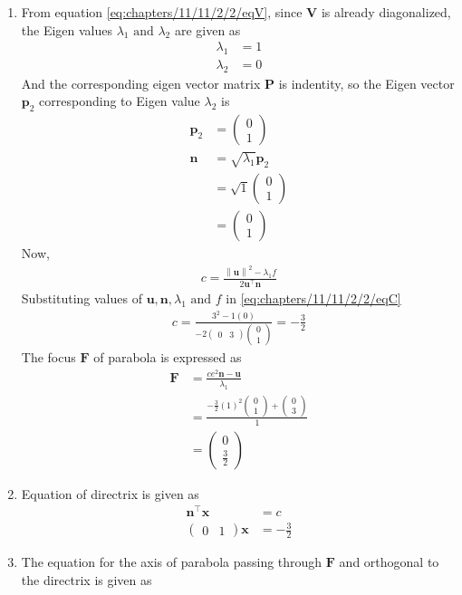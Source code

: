 \documentclass[12pt]{article}
\providecommand{\brak}[1]{\ensuremath{\left(#1\right)}}
\providecommand{\norm}[1]{\left\lVert#1\right\rVert}
\newcommand{\myvec}[1]{\ensuremath{\begin{pmatrix}#1\end{pmatrix}}}
\let\vec\mathbf
\begin{document}
\begin{enumerate}
\item From equation \eqref{eq:chapters/11/11/2/2/eqV}, since $\vec{V}$ is already diagonalized, the Eigen values $\lambda_1 \text{ and } \lambda_2$ are given as
\begin{align}
	\label{eq:chapters/11/11/2/2/eqEigen1}
	\lambda_1 &= 1\\
	\label{eq:chapters/11/11/2/2/eqEigen2}
	\lambda_2 &= 0
\end{align}
And the corresponding eigen vector matrix $\vec{P}$ is indentity, so the Eigen vector $\vec{p}_2$ corresponding to Eigen value $\lambda_2$ is
\begin{align}
	\vec{p}_2 &= \myvec{0\\1}\\
	\vec{n} &= \sqrt{\lambda_1}\vec{p}_2\\
		&= \sqrt{1}\myvec{0\\1}\\
		&= \myvec{0\\1}
\end{align}
Now,
\begin{align}
	\label{eq:chapters/11/11/2/2/eqC}
	c = \frac{\norm{\vec{u}}^2 - \lambda_1 f}{2\vec{u}^\top \vec{n}}
\end{align}
Substituting values of $\vec{u},\vec{n},\lambda_1 \text{ and } f$ in \eqref{eq:chapters/11/11/2/2/eqC}
\begin{align}
	c = \frac{3^2-1\brak{0}}{-2\myvec{0&3}\myvec{0\\1}} = -\frac{3}{2}
\end{align}
The focus $\vec{F}$ of parabola is expressed as
\begin{align}
	\vec{F} &= \frac{ce^2 \vec{n}-\vec{u}}{\lambda_1}\\
		&= \frac{-\frac{3}{2}\brak{1}^2 \myvec{0\\1}+\myvec{0\\3}}{1}\\
		&= \myvec{0\\\frac{3}{2}}
\end{align}
\item Equation of directrix is given as
\begin{align}
	\vec{n}^\top \vec{x} &= c\\
	\myvec{0&1}\vec{x} &= -\frac{3}{2}
\end{align}
\item The equation for the axis of parabola passing through $\vec{F}$ and orthogonal to the directrix is given as
\begin{align}

\end{align}
\end{enumerate}
\end{document}
